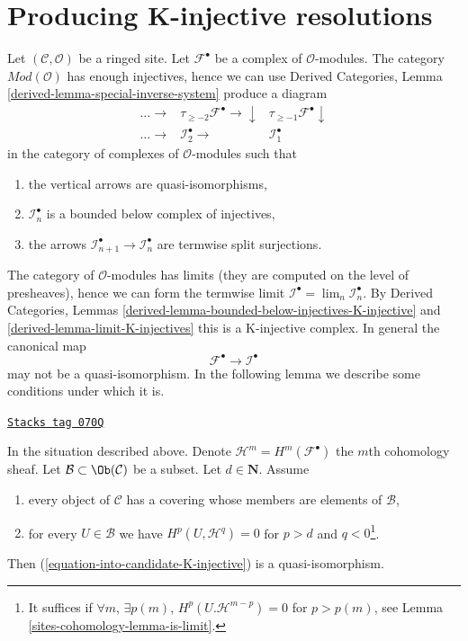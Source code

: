 \section{Producing K-injective resolutions}
\label{sites-cohomology-section-K-injective}
Let $(\mathcal{C}, \mathcal{O})$ be a ringed site.
Let $\mathcal{F}^\bullet$ be a complex of $\mathcal{O}$-modules.
The category $\textit{Mod}(\mathcal{O})$ has enough injectives, hence
we can use
Derived Categories, Lemma \ref{derived-lemma-special-inverse-system}
produce a diagram
$$
\begin{array}{ccc}\ldots \longrightarrow & \tau_{\geq -2}\mathcal{F}^\bullet \longrightarrow\downarrow & \tau_{\geq -1}\mathcal{F}^\bullet \downarrow \\ \ldots \longrightarrow & \mathcal{I}_2^\bullet \longrightarrow & \mathcal{I}_1^\bullet\end{array}
$$
in the category of complexes of $\mathcal{O}$-modules such that
\begin{enumerate}
\item the vertical arrows are quasi-isomorphisms,
\item $\mathcal{I}_n^\bullet$ is a bounded below complex of injectives,
\item the arrows $\mathcal{I}_{n + 1}^\bullet \to \mathcal{I}_n^\bullet$
are termwise split surjections.
\end{enumerate}
The category of $\mathcal{O}$-modules has limits (they are computed
on the level of presheaves), hence we can form the termwise limit
$\mathcal{I}^\bullet = \lim_n \mathcal{I}_n^\bullet$. By
Derived Categories, Lemmas
\ref{derived-lemma-bounded-below-injectives-K-injective} and
\ref{derived-lemma-limit-K-injectives}
this is a K-injective complex. In general the canonical map
\begin{equation}
\label{equation-into-candidate-K-injective}
\mathcal{F}^\bullet \to \mathcal{I}^\bullet
\end{equation}
may not be a quasi-isomorphism. In the following lemma we describe some
conditions under which it is.

\begin{lemma}[K injective]
\label{sites-cohomology-lemma-K-injective}
\href{https://stacks.math.columbia.edu/tag/070Q}{\texttt{Stacks tag 070Q}}

In the situation described above. Denote
$\mathcal{H}^m = H^m(\mathcal{F}^\bullet)$ the $m$th cohomology sheaf.
Let $\mathcal{B} \subset \Ob(\mathcal{C})$ be a subset.
Let $d \in \mathbf{N}$.
Assume
\begin{enumerate}
\item every object of $\mathcal{C}$ has a covering whose members are
elements of $\mathcal{B}$,
\item for every $U \in \mathcal{B}$ we have $H^p(U, \mathcal{H}^q) = 0$
for $p > d$ and $q < 0$\footnote{It suffices if
$\forall m$, $\exists p(m)$, $H^p(U. \mathcal{H}^{m - p}) = 0$ for
$p > p(m)$, see Lemma \ref{sites-cohomology-lemma-is-limit}.}.
\end{enumerate}
Then (\ref{equation-into-candidate-K-injective}) is a quasi-isomorphism.
\end{lemma}

